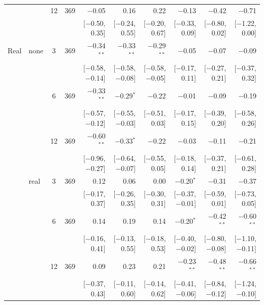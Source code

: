 \begin{longtable}{llcrrrrrrr}
 &  & 12 & 369 & $-$0.05 & 0.16 & 0.22 & $-$0.13 & $-$0.42 & $-$0.71\\
 & & & & {\scriptsize [$-$0.50, 0.35]} & {\scriptsize [$-$0.24, 0.55]} & {\scriptsize [$-$0.20, 0.67]} & {\scriptsize [$-$0.33, 0.09]} & {\scriptsize [$-$0.80, 0.02]} & {\scriptsize [$-$1.22, 0.00]}\\
\addlinespace
Real & none & 3 & 369 & $-$0.34$^{**}$ & $-$0.33$^{**}$ & $-$0.29$^{**}$ & $-$0.05 & $-$0.07 & $-$0.09\\
 & & & & {\scriptsize [$-$0.58, $-$0.14]} & {\scriptsize [$-$0.58, $-$0.08]} & {\scriptsize [$-$0.58, $-$0.05]} & {\scriptsize [$-$0.17, 0.11]} & {\scriptsize [$-$0.27, 0.21]} & {\scriptsize [$-$0.37, 0.32]}\\
 &  & 6 & 369 & $-$0.33$^{**}$ & $-$0.29$^{*}$ & $-$0.22 & $-$0.01 & $-$0.09 & $-$0.19\\
 & & & & {\scriptsize [$-$0.57, $-$0.12]} & {\scriptsize [$-$0.55, $-$0.03]} & {\scriptsize [$-$0.51, 0.03]} & {\scriptsize [$-$0.17, 0.15]} & {\scriptsize [$-$0.39, 0.20]} & {\scriptsize [$-$0.58, 0.26]}\\
 &  & 12 & 369 & $-$0.60$^{**}$ & $-$0.33$^{*}$ & $-$0.22 & $-$0.03 & $-$0.11 & $-$0.21\\
 & & & & {\scriptsize [$-$0.96, $-$0.27]} & {\scriptsize [$-$0.64, $-$0.07]} & {\scriptsize [$-$0.55, 0.05]} & {\scriptsize [$-$0.18, 0.14]} & {\scriptsize [$-$0.37, 0.21]} & {\scriptsize [$-$0.61, 0.28]}\\
 & real & 3 & 369 & 0.12 & 0.06 & 0.00 & $-$0.20$^{*}$ & $-$0.31 & $-$0.37\\
 & & & & {\scriptsize [$-$0.17, 0.37]} & {\scriptsize [$-$0.26, 0.35]} & {\scriptsize [$-$0.30, 0.31]} & {\scriptsize [$-$0.37, $-$0.01]} & {\scriptsize [$-$0.59, 0.01]} & {\scriptsize [$-$0.73, 0.05]}\\
 &  & 6 & 369 & 0.14 & 0.19 & 0.14 & $-$0.20$^{*}$ & $-$0.42$^{**}$ & $-$0.60$^{**}$\\
 & & & & {\scriptsize [$-$0.16, 0.41]} & {\scriptsize [$-$0.13, 0.55]} & {\scriptsize [$-$0.18, 0.53]} & {\scriptsize [$-$0.40, $-$0.02]} & {\scriptsize [$-$0.80, $-$0.08]} & {\scriptsize [$-$1.10, $-$0.11]}\\
 &  & 12 & 369 & 0.09 & 0.23 & 0.21 & $-$0.23$^{**}$ & $-$0.48$^{**}$ & $-$0.66$^{**}$\\
 & & & & {\scriptsize [$-$0.37, 0.43]} & {\scriptsize [$-$0.11, 0.60]} & {\scriptsize [$-$0.14, 0.62]} & {\scriptsize [$-$0.41, $-$0.06]} & {\scriptsize [$-$0.84, $-$0.12]} & {\scriptsize [$-$1.24, $-$0.10]}\\

\end{longtable}
